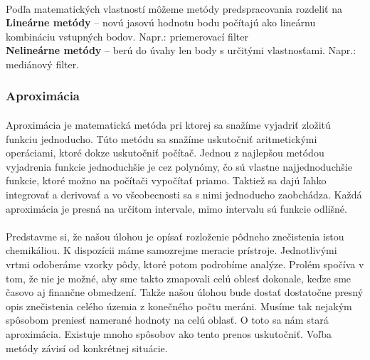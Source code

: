 \documentclass[12pt]{article}
\begin{document}
\paragraph{}
Podľa matematických vlastností môžeme metódy predspracovania rozdeliť na \\
\textbf{Lineárne metódy} – novú jasovú hodnotu bodu počítajú ako lineárnu kombináciu vstupných bodov. Napr.: priemerovací filter \\
\textbf{Nelineárne metódy} – berú do úvahy len body s určitými vlastnosťami. Napr.: mediánový filter.
\cite{DIP}
\subsubsection{Aproximácia}
\paragraph{}
Aproximácia je matematická metóda pri ktorej sa snažíme vyjadriť zložitú funkciu jednoducho. Túto metódu sa snažíme uskutočniť aritmetickými operáciami, ktoré dokze uskutočniť počítač.
Jednou z najlepšou metódou vyjadrenia funkcie jednoduchšie je cez polynómy, čo sú vlastne najjednoduchšie funkcie, ktoré možno na počítači vypočítať priamo. Taktiež sa dajú ľahko integrovať a derivovať a vo všeobecnosti sa s nimi jednoducho zaobchádza.
Každá aproximácia je presná na určitom intervale, mimo intervalu sú funkcie odlišné.
\cite{aproximacia}
\paragraph{}
Predstavme si, že našou úlohou je opísať rozloženie pôdneho znečistenia istou chemikáliou. K dispozícii máme samozrejme meracie prístroje. Jednotlivými vrtmi odoberáme vzorky pôdy, ktoré potom podrobíme analýze.
Prolém spočíva v tom, že nie je možné, aby sme takto zmapovali celú oblesť dokonale, keďze sme časovo aj finančne obmedzení. Takže našou úlohou bude dostať dostatočne presný opis znečistenia celého územia z konečného počtu meráni.
Musíme tak nejakým spôsobom preniesť namerané hodnoty na celú oblasť. O toto sa nám stará aproximácia. Existuje mnoho spôsobov ako tento prenos uskutočniť. Voľba metódy závisí od konkrétnej situácie.
\cite{num_metody}
\end{document}
